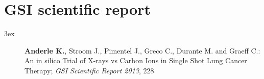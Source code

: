 \section*{GSI scientific report}
\begin{setlength}{\leftmargini}{3ex}
  \begin{description}
    \item[] \textbf{Anderle K.}, Stroom J., Pimentel J., Greco C., Durante M. and Graeff C.: An in silico Trial of X-rays vs Carbon Ions in Single Shot Lung Cancer Therapy; \textit{GSI Scientific Report 2013}, 228
  \end{description}
\end{setlength}



